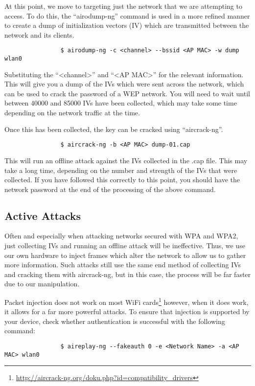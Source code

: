 			At this point, we move to targeting just the network that we are attempting to access.
			To do this, the ``airodump-ng'' command is used in a more refined manner to create a dump of initialization vectors (IV) which are transmitted between the network and its clients.
			\begin{verbatim}
				$ airodump-ng -c <channel> --bssid <AP MAC> -w dump wlan0
			\end{verbatim}
			Substituting the ``<channel>'' and ``<AP MAC>'' for the relevant information.
			This will give you a dump of the IVs which were sent across the network, which can be used to crack the password of a WEP network.
			You will need to wait until between 40000 and 85000 IVs have been collected, which may take some time depending on the network traffic at the time.

			Once this has been collected, the key can be cracked using ``aircrack-ng''.
			\begin{verbatim}
				$ aircrack-ng -b <AP MAC> dump-01.cap
			\end{verbatim}
			This will run an offline attack against the IVs collected in the .cap file.
			This may take a long time, depending on the number and strength of the IVs that were collected.
			If you have followed this correctly to this point, you should have the network password at the end of the processing of the above command.
		\subsection{Active Attacks}
			Often and especially when attacking networks secured with WPA and WPA2, just collecting IVs and running an offline attack will be ineffective.
			Thus, we use our own hardware to inject frames which alter the network to allow us to gather more information.
			Such attacks still use the same end method of collecting IVs and cracking them with aircrack-ng, but in this case, the process will be far faster due to our manipulation.

			Packet injection does not work on most WiFi cards\footnote{\url{http://aircrack-ng.org/doku.php?id=compatibility\_drivers}}
			however, when it does work, it allows for a far more powerful attacks.
			To ensure that injection is supported by your device, check whether authentication is successful with the following command:
			\begin{verbatim}
				$ aireplay-ng --fakeauth 0 -e <Network Name> -a <AP MAC> wlan0
			\end{verbatim}

